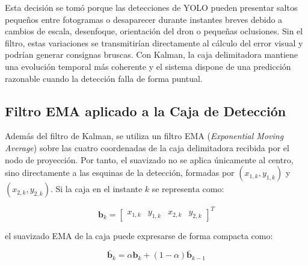 \vspace{0.3cm}

Esta decisión se tomó porque las detecciones de YOLO pueden presentar saltos pequeños entre fotogramas o desaparecer durante instantes breves debido a cambios de escala, desenfoque, orientación del dron o pequeñas oclusiones. Sin el filtro, estas variaciones se transmitirían directamente al cálculo del error visual y podrían generar consignas bruscas. Con Kalman, la caja delimitadora mantiene una evolución temporal más coherente y el sistema dispone de una predicción razonable cuando la detección falla de forma puntual.

\vspace{0.3cm}

\subsection{Filtro EMA aplicado a la Caja de Detección}

\vspace{0.3cm}

Además del filtro de Kalman, se utiliza un filtro EMA (\textit{Exponential Moving Average}) sobre las cuatro coordenadas de la caja delimitadora recibida por el nodo de proyección. Por tanto, el suavizado no se aplica únicamente al centro, sino directamente a las esquinas de la detección, formadas por $(x_{1,k}, y_{1,k})$ y $(x_{2,k}, y_{2,k})$. Si la caja en el instante $k$ se representa como:

\vspace{0.3cm}

\begin{equation}
\mathbf{b}_k = \left[ \begin{array}{cccc}
x_{1,k} & y_{1,k} & x_{2,k} & y_{2,k}
\end{array} \right]^T
\end{equation}

\vspace{0.3cm}

el suavizado EMA de la caja puede expresarse de forma compacta como:

\vspace{0.3cm}

\begin{equation}
\bar{\mathbf{b}}_k = \alpha \mathbf{b}_k + (1 - \alpha)\bar{\mathbf{b}}_{k-1}
\end{equation}

\vspace{0.3cm}

